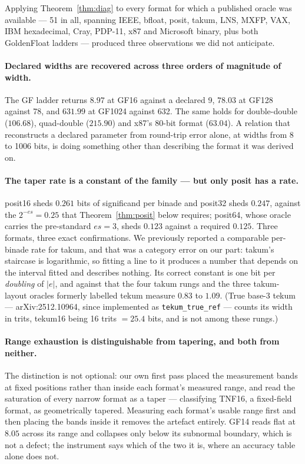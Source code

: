 Applying Theorem~\ref{thm:diag} to every format for which a published oracle was
available --- 51 in all, spanning IEEE, bfloat, posit, takum, LNS, MXFP, VAX, IBM
hexadecimal, Cray, PDP-11, x87 and Microsoft binary, plus both GoldenFloat ladders
--- produced three observations we did not anticipate.

\paragraph{Declared widths are recovered across three orders of magnitude of
width.} The GF ladder returns $8.97$ at GF16 against a declared 9, $78.03$ at
GF128 against 78, and $631.99$ at GF1024 against 632. The same holds for
double-double ($106.68$), quad-double ($215.90$) and x87's 80-bit format
($63.04$). A relation that reconstructs a declared parameter from round-trip error
alone, at widths from 8 to 1006 bits, is doing something other than describing the
format it was derived on.

\paragraph{The taper rate is a constant of the family --- but only posit has a
rate.} posit16 sheds $0.261$ bits of significand per binade and posit32 sheds
$0.247$, against the $2^{-es} = 0.25$ that Theorem~\ref{thm:posit} below requires;
posit64, whose oracle carries the pre-standard $es = 3$, sheds $0.123$ against a
required $0.125$. Three formats, three exact confirmations. We previously reported
a comparable per-binade rate for takum, and that was a category error on our part:
takum's staircase is logarithmic, so fitting a line to it produces a number that
depends on the interval fitted and describes nothing. Its correct constant is one
bit per \emph{doubling} of $|e|$, and against that the four takum rungs and the
three takum-layout oracles formerly labelled tekum measure $0.83$ to $1.09$.
(True base-3 tekum --- arXiv:2512.10964, since implemented as
\texttt{tekum\_true\_ref} --- counts its width in trits, tekum16 being 16 trits
$= 25.4$ bits, and is not among these rungs.)

\paragraph{Range exhaustion is distinguishable from tapering, and both from
neither.} The distinction is not optional: our own first pass placed the
measurement bands at fixed positions rather than inside each format's measured
range, and read the saturation of every narrow format as a taper --- classifying
TNF16, a fixed-field format, as geometrically tapered. Measuring each format's
usable range first and then placing the bands inside it removes the artefact
entirely. GF14 reads flat at $8.05$ across its range and collapses only below its
subnormal boundary, which is not a defect; the instrument says which of the two it
is, where an accuracy table alone does not.


